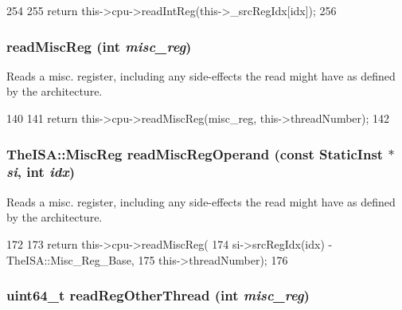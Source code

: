 \begin{DoxyCode}
254     {
255         return this->cpu->readIntReg(this->_srcRegIdx[idx]);
256     }
\end{DoxyCode}
\hypertarget{classBaseO3DynInst_a5a8c6c487e8da143d26188258b04f1cc}{
\subsubsection[{readMiscReg}]{ readMiscReg (int {\em misc\_\-reg})}}
\label{classBaseO3DynInst_a5a8c6c487e8da143d26188258b04f1cc}
Reads a misc. register, including any side-\/effects the read might have as defined by the architecture. 


\begin{DoxyCode}
140     {
141         return this->cpu->readMiscReg(misc_reg, this->threadNumber);
142     }
\end{DoxyCode}
\hypertarget{classBaseO3DynInst_a8819b43df521f472deabd5db35f896e7}{
\subsubsection[{readMiscRegOperand}]{\setlength{\rightskip}{0pt plus 5cm}TheISA::MiscReg readMiscRegOperand (const {\bf StaticInst} $\ast$ {\em si}, \/  int {\em idx})}}
\label{classBaseO3DynInst_a8819b43df521f472deabd5db35f896e7}
Reads a misc. register, including any side-\/effects the read might have as defined by the architecture. 


\begin{DoxyCode}
172     {
173         return this->cpu->readMiscReg(
174                 si->srcRegIdx(idx) - TheISA::Misc_Reg_Base,
175                 this->threadNumber);
176     }
\end{DoxyCode}
\hypertarget{classBaseO3DynInst_a77cf978e7a92e33083fcc62cb7ead74d}{
\subsubsection[{readRegOtherThread}]{\setlength{\rightskip}{0pt plus 5cm}uint64\_\-t readRegOtherThread (int {\em misc\_\-reg})}}
\label{classBaseO3DynInst_a77cf978e7a92e33083fcc62cb7ead74d}



